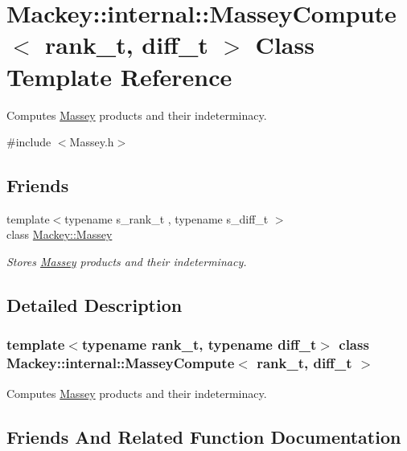 \hypertarget{classMackey_1_1internal_1_1MasseyCompute}{}\section{Mackey\+:\+:internal\+:\+:Massey\+Compute$<$ rank\+\_\+t, diff\+\_\+t $>$ Class Template Reference}
\label{classMackey_1_1internal_1_1MasseyCompute}


Computes \hyperlink{classMackey_1_1Massey}{Massey} products and their indeterminacy.  




{\ttfamily \#include $<$Massey.\+h$>$}

\subsection*{Friends}
\begin{DoxyCompactItemize}
\item 
{\footnotesize template$<$typename s\+\_\+rank\+\_\+t , typename s\+\_\+diff\+\_\+t $>$ }\\class \hyperlink{classMackey_1_1internal_1_1MasseyCompute_a631db15cb61e8407e5ec0c5875905d39}{Mackey\+::\+Massey}
\begin{DoxyCompactList}\small\item\em Stores \hyperlink{classMackey_1_1Massey}{Massey} products and their indeterminacy. \end{DoxyCompactList}\end{DoxyCompactItemize}


\subsection{Detailed Description}
\subsubsection*{template$<$typename rank\+\_\+t, typename diff\+\_\+t$>$\newline
class Mackey\+::internal\+::\+Massey\+Compute$<$ rank\+\_\+t, diff\+\_\+t $>$}

Computes \hyperlink{classMackey_1_1Massey}{Massey} products and their indeterminacy. 

\subsection{Friends And Related Function Documentation}
\mbox{\label{classMackey_1_1internal_1_1MasseyCompute_a631db15cb61e8407e5ec0c5875905d39}} 
